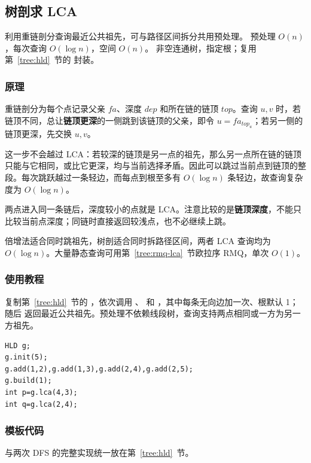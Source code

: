 \subsection{树剖求 LCA}
\label{tree:hld-lca}
\AlgorithmInfo
    {利用重链剖分查询最近公共祖先，可与路径区间拆分共用预处理。}
    {预处理 $O(n)$，每次查询 $O(\log n)$，空间 $O(n)$。}
    {非空连通树，指定根；复用第~\ref{tree:hld}~节的  封装。}
\subsubsection*{原理}
重链剖分为每个点记录父亲 $fa$、深度 $dep$ 和所在链的链顶 $top$。查询 $u,v$ 时，若链顶不同，总让\textbf{链顶更深}的一侧跳到该链顶的父亲，即令 $u=fa_{top_u}$；若另一侧的链顶更深，先交换 $u,v$。

这一步不会越过 LCA：若较深的链顶是另一点的祖先，那么另一点所在链的链顶只能与它相同，或比它更深，均与当前选择矛盾。因此可以跳过当前点到链顶的整段。每次跳跃越过一条轻边，而每点到根至多有 $O(\log n)$ 条轻边，故查询复杂度为 $O(\log n)$。

两点进入同一条链后，深度较小的点就是 LCA。注意比较的是\textbf{链顶深度}，不能只比较当前点深度；同链时直接返回较浅点，也不必继续上跳。

倍增法适合同时跳祖先，树剖适合同时拆路径区间，两者 LCA 查询均为 $O(\log n)$。大量静态查询可用第~\ref{tree:rmq-lca}~节欧拉序 RMQ，单次 $O(1)$。

\subsubsection*{使用教程}
复制第~\ref{tree:hld}~节的 ，依次调用 、 和 ，其中每条无向边加一次、根默认 1；随后  返回最近公共祖先。预处理不依赖线段树，查询支持两点相同或一方为另一方祖先。
\begin{lstlisting}[style=mtycpp,numbers=none]
HLD g;
g.init(5);
g.add(1,2),g.add(1,3),g.add(2,4),g.add(2,5);
g.build(1);
int p=g.lca(4,3);
int q=g.lca(2,4);
\end{lstlisting}
\subsubsection*{模板代码}
 与两次 DFS 的完整实现统一放在第~\ref{tree:hld}~节。
